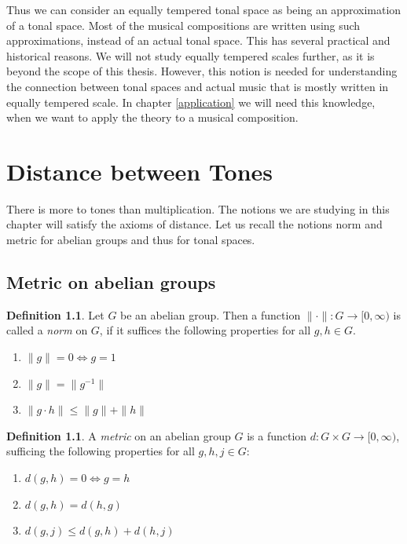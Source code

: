\documentclass[a4paper]{book}
\theoremstyle{definition}
\newtheorem{definition}[theorem]{Definition}
\begin{document}
Thus we can consider an equally tempered tonal space as being an approximation of a tonal space.
Most of the musical compositions are written using such approximations, instead of an actual tonal space.
This has several practical and historical reasons.
We will not study equally tempered scales further, as it is beyond the scope of this thesis.
However, this notion is needed for understanding the connection between tonal spaces and actual music that is mostly written in equally tempered scale.
In chapter \ref{application} we will need this knowledge, when we want to apply the theory to a musical composition.


\chapter{Distance between Tones}
\label{distance}
There is more to tones than multiplication.
The notions we are studying in this chapter will satisfy the axioms of distance.
Let us recall the notions norm and metric for abelian groups and thus for tonal spaces.

\section{Metric on abelian groups}

\begin{definition}
    Let $G$ be an abelian group.
    Then a function $\|\cdot\|:G \to [0,\infty)$ is called a \emph{norm} on $G$, if it suffices the following properties for all $g,h \in G$.
	\begin{enumerate}[i]
		\item $\|g\| = 0 \Leftrightarrow g=1$
        \item $\|g\| = \|g^{-1}\|$
		\item $\|g \cdot h\| \leq \|g\| + \|h\|$
	\end{enumerate}
\end{definition}

\begin{definition}
	A \emph{metric} on an abelian group $G$ is a function $d:G \times G \to [0,\infty)$, sufficing the following properties for all $g,h,j \in G$:
	\begin{enumerate}[i]
		\item $d(g,h) = 0 \Leftrightarrow g=h$
		\item $d(g,h) = d(h,g)$
		\item $d(g,j) \leq d(g,h) + d(h,j)$
	\end{enumerate}
\end{definition}
\end{document}
